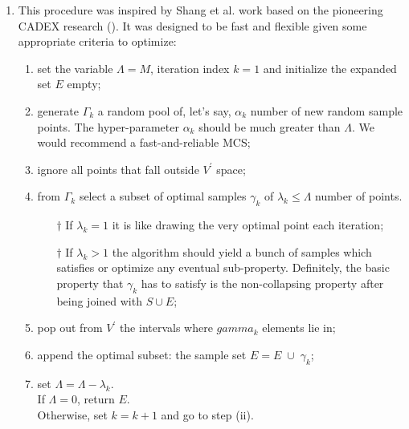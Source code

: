\documentclass[12pt]{extarticle}
\begin{document}
\begin{enumerate}
\begin{enumerate}
	\item This procedure was inspired by Shang et al. work based on the pioneering CADEX research (). It was designed to be fast and flexible given some appropriate criteria to optimize:
	\begin{enumerate}

		\item set the variable $\Lambda = M$, iteration index $k = 1$ and initialize the expanded set $E$ empty;

		\item generate $\Gamma_k$ a random pool of, let's say, $\alpha_k$ number of new random sample points. The hyper-parameter $\alpha_k$ should be much greater than $\Lambda$. We would recommend a fast-and-reliable MCS;
	
		\item ignore all points that fall outside $V^\prime$ space;

		\item from $\Gamma_k$ select a subset of optimal samples $\gamma_k$ of $\lambda_k \leq \Lambda$ number of points.
	
		\begin{enumerate}
			\item[$\dagger$] If $\lambda_k = 1$ it is like drawing the very optimal point each iteration;
			\item[$\dagger$] If $\lambda_k > 1$ the algorithm should yield a bunch of samples which satisfies or optimize any eventual sub-property. Definitely, the basic property that $\gamma_k$ has to satisfy is the non-collapsing property after being joined with $S \cup E$;
		\end{enumerate}
	
		\item pop out from $V^\prime$ the intervals where $gamma_k$ elements lie in;
	
		\item append the optimal subset: the sample set $E = E \; \cup \;\gamma_k$;
	
		\item set $\Lambda = \Lambda - \lambda_k$. \\
		If $\Lambda = 0$, return $E$. \\
		Otherwise, set $k = k + 1$ and go to step (ii).

	\end{enumerate}
	

\end{enumerate}
\end{enumerate}
\end{document}
